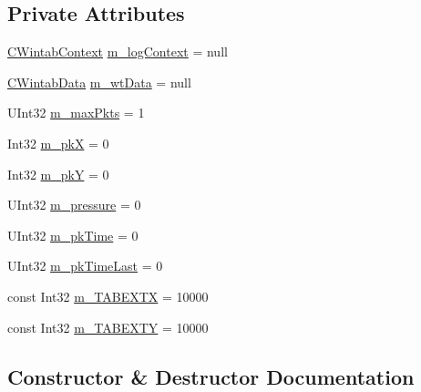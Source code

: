 \subsection*{Private Attributes}
\begin{DoxyCompactItemize}
\item 
\mbox{\hyperlink{class_wintab_d_n_1_1_c_wintab_context}{C\+Wintab\+Context}} \mbox{\hyperlink{class_paint___program_1_1_tablet_info_a1e7da115e188bc9294ab639f5f75e61b}{m\+\_\+log\+Context}} = null
\item 
\mbox{\hyperlink{class_wintab_d_n_1_1_c_wintab_data}{C\+Wintab\+Data}} \mbox{\hyperlink{class_paint___program_1_1_tablet_info_a7c514892b904d4d34d22791cd9047b82}{m\+\_\+wt\+Data}} = null
\item 
U\+Int32 \mbox{\hyperlink{class_paint___program_1_1_tablet_info_a70180b4d0d8ac8fe1cc200c20856a171}{m\+\_\+max\+Pkts}} = 1
\item 
Int32 \mbox{\hyperlink{class_paint___program_1_1_tablet_info_a8a6421486fbf0fc498b735e0de3290ee}{m\+\_\+pkX}} = 0
\item 
Int32 \mbox{\hyperlink{class_paint___program_1_1_tablet_info_a8c23e48316f05b16fb46c8eb4ebc6308}{m\+\_\+pkY}} = 0
\item 
U\+Int32 \mbox{\hyperlink{class_paint___program_1_1_tablet_info_a582fe5c923f467fbf898aeac0d7780dd}{m\+\_\+pressure}} = 0
\item 
U\+Int32 \mbox{\hyperlink{class_paint___program_1_1_tablet_info_af7b50d0820544e080adf02c24b309959}{m\+\_\+pk\+Time}} = 0
\item 
U\+Int32 \mbox{\hyperlink{class_paint___program_1_1_tablet_info_a8f8efea7a323142ae19efd50b02b859e}{m\+\_\+pk\+Time\+Last}} = 0
\item 
const Int32 \mbox{\hyperlink{class_paint___program_1_1_tablet_info_aec96087301274b16e37ad97d9d86f2a8}{m\+\_\+\+T\+A\+B\+E\+X\+TX}} = 10000
\item 
const Int32 \mbox{\hyperlink{class_paint___program_1_1_tablet_info_a694255f1b42334dcd3c05f6ff9b0ff6d}{m\+\_\+\+T\+A\+B\+E\+X\+TY}} = 10000
\end{DoxyCompactItemize}


\subsection{Constructor \& Destructor Documentation}
\mbox{\label{class_paint___program_1_1_tablet_info_afc7015701d66e276d81ffb40fb22e381}} 
